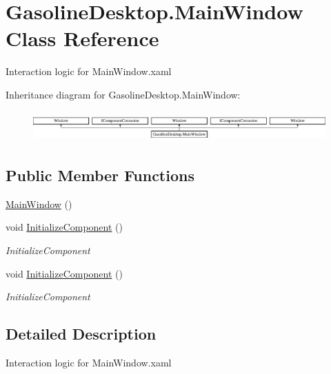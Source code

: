 \hypertarget{class_gasoline_desktop_1_1_main_window}{}\section{Gasoline\+Desktop.\+Main\+Window Class Reference}
\label{class_gasoline_desktop_1_1_main_window}


Interaction logic for Main\+Window.\+xaml  


Inheritance diagram for Gasoline\+Desktop.\+Main\+Window\+:\begin{figure}[H]
\begin{center}
\leavevmode
\includegraphics[height=1.178947cm]{class_gasoline_desktop_1_1_main_window}
\end{center}
\end{figure}
\subsection*{Public Member Functions}
\begin{DoxyCompactItemize}
\item 
\mbox{\hyperlink{class_gasoline_desktop_1_1_main_window_afe2a05298a09a828b0417aa757865f80}{Main\+Window}} ()
\item 
void \mbox{\hyperlink{class_gasoline_desktop_1_1_main_window_a77dc8b8bfe9e1d5b1728901888254606}{Initialize\+Component}} ()
\begin{DoxyCompactList}\small\item\em Initialize\+Component \end{DoxyCompactList}\item 
void \mbox{\hyperlink{class_gasoline_desktop_1_1_main_window_a77dc8b8bfe9e1d5b1728901888254606}{Initialize\+Component}} ()
\begin{DoxyCompactList}\small\item\em Initialize\+Component \end{DoxyCompactList}\end{DoxyCompactItemize}


\subsection{Detailed Description}
Interaction logic for Main\+Window.\+xaml 

